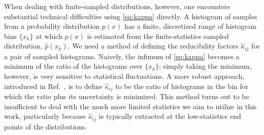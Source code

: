 \documentclass[aps,prl,twocolumn,preprintnumbers,showpacs,floatfix,nofootinbib]{revtex4-1}
\newcommand{\Refc}[1]{Ref.~\cite{#1}}
\begin{document}
When dealing with finite-sampled distributions, however, one encounters substantial technical difficulties using \cref{eq:kappa} directly.
%
A histogram of samples from a probability distribution $p(x)$ has a finite, discretized range of histogram bins $\{x_k\}$ at which $p(x)$ is estimated from the finite-statistics sampled distribution, $\hat{p}(x_k)$.
%
We need a method of defining the reducibility factors $\hat{\kappa}_{i j}$ for a pair of sampled histograms.
%
Naively, the infimum of \cref{eq:kappa} becomes a minimum of the ratio of the histograms over $\{x_k\}$; simply taking the minimum, however, is very sensitive to statistical fluctuations.
%
A more robust approach, introduced in \Refc{Komiske:2018vkc}, is to define $\hat{\kappa}_{i j}$ to be the ratio of histograms in the bin for which the ratio plus its uncertainty is minimized.
%
This method turns out to be insufficient to deal with the much more limited statistics we aim to utilize in this work, particularly because $\hat{\kappa}_{i j}$ is typically extracted at the low-statistics end points of the distributions.
\end{document}
